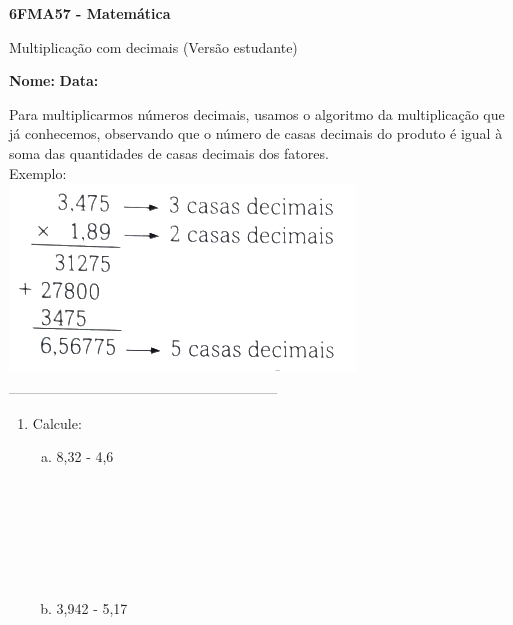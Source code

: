 \documentclass[a4paper,14pt]{article}
\begin{document}
	
	\noindent\textbf{6FMA57 - Matemática} 
	
	\begin{center}Multiplicação com decimais (Versão estudante)
	\end{center}
	
	\noindent\textbf{Nome:} \underline{\hspace{10cm}}
	\noindent\textbf{Data:} \underline{\hspace{4cm}}
	
	\begin{multicols}{2}
		\noindent Para multiplicarmos números decimais, usamos o algoritmo da multiplicação que já conhecemos, observando que o número de casas decimais do produto é igual à soma das quantidades de casas decimais dos fatores. \\
		Exemplo: \\
		\includegraphics[width=1\linewidth]{6FMA57_imagens/imagem1}
	\noindent\textsubscript{---------------------------------------------------------------------}
    	\begin{enumerate}
    		\item Calcule:
    		\begin{enumerate}[a)]
    			\item 8,32 - 4,6 \\\\\\\\\\\\\\
    			\item 3,942 - 5,17 \\\\\\\\\\\\\\

\end{enumerate}
\end{enumerate}
\end{multicols}
\end{document}
